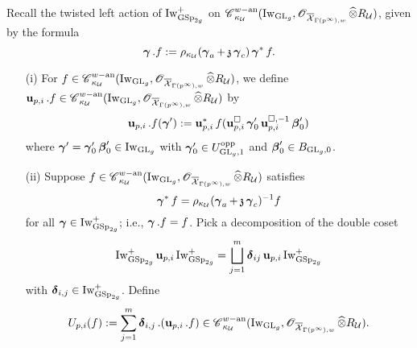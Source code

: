 Recall the twisted left action of $\Iw^+_{\GSp_{2g}}$ on $\scrC^{w-\an}_{\kappa_{\calU}}(\Iw_{\GL_g}, \scrO_{\overline{\calX}_{\Gamma(p^{\infty}),w}}\widehat{\otimes}R_{\calU})$, given by the formula
$$\bfgamma. f:= \rho_{\kappa_{\calU}}(\bfgamma_a+\frakz \bfgamma_c)\bfgamma^*f.$$

\begin{Definition}\label{Definition:Upi}
\begin{enumerate}
\item[(i)] For $f\in \scrC^{w-\an}_{\kappa_{\calU}}(\Iw_{\GL_g}, \scrO_{\overline{\calX}_{\Gamma(p^{\infty}),w}}\widehat{\otimes}R_{\calU})$, we define $\bfu_{p,i}.f\in \scrC^{w-\an}_{\kappa_{\calU}}(\Iw_{\GL_g}, \scrO_{\overline{\calX}_{\Gamma(p^{\infty}),w}}\widehat{\otimes}R_{\calU})$ by
$$\bfu_{p,i}.f(\bfgamma'):=\bfu_{p,i}^*f(\bfu_{p,i}^{\square}\bfgamma'_0\bfu_{p,i}^{\square,-1}\bfbeta'_0)$$ where $\bfgamma'=\bfgamma'_0\bfbeta'_0\in \Iw_{\GL_g}$ with $\bfgamma'_0\in U^{\opp}_{\GL_g,1}$ and $\bfbeta'_0\in B_{\GL_g,0}$.
\item[(ii)] Suppose $f\in \scrC^{w-\an}_{\kappa_{\calU}}(\Iw_{\GL_g}, \scrO_{\overline{\calX}_{\Gamma(p^{\infty}),w}}\widehat{\otimes}R_{\calU})$ satisfies $$\bfgamma^*f=\rho_{\kappa_{\calU}}(\bfgamma_a+\frakz\bfgamma_c)^{-1}f$$ for all $\bfgamma\in \Iw^+_{\GSp_{2g}}$; i.e., $\bfgamma.f=f$. Pick a decomposition of the double coset
$$\Iw^+_{\GSp_{2g}}\bfu_{p,i}\Iw^+_{\GSp_{2g}}=\bigsqcup_{j=1}^m \bfdelta_{ij}\bfu_{p,i}\Iw^+_{\GSp_{2g}}$$
with $\bfdelta_{i,j}\in \Iw^+_{\GSp_{2g}}$. Define
$$U_{p,i}(f):=\sum_{j=1}^m \bfdelta_{i,j}.(\bfu_{p,i}.f)\in \scrC^{w-\an}_{\kappa_{\calU}}(\Iw_{\GL_g}, \scrO_{\overline{\calX}_{\Gamma(p^{\infty}),w}}\widehat{\otimes}R_{\calU}).$$
\end{enumerate}
\end{Definition}

